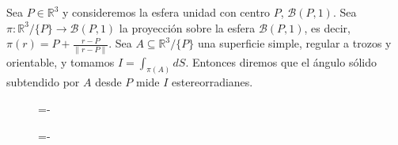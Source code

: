 \begin{definicion}
    Sea $P \in \mathds{R}^3$ y consideremos la esfera unidad con centro $P$, $\mathcal{B}(P,1)$. Sea $\pi :\mathds{R}^3/\{P\}\rightarrow \mathcal{B}(P,1)$ la proyección sobre la esfera $\mathcal{B}(P,1)$, es decir, $\pi(r) = P + \frac{r-P}{\|r-P\|}$. Sea $A \subseteq \mathds{R}^3/\{P\}$ una superficie simple, regular a trozos y orientable, y tomamos $I = \int _{\pi(A)} dS$. Entonces diremos que el ángulo sólido subtendido por $A$ desde $P$ mide $I$ estereorradianes.
\end{definicion}

\begin{figure}[h]
  \lineskip=-\fboxrule
\end{figure}

\begin{figure}[h]
  \lineskip=-\fboxrule
\end{figure}

